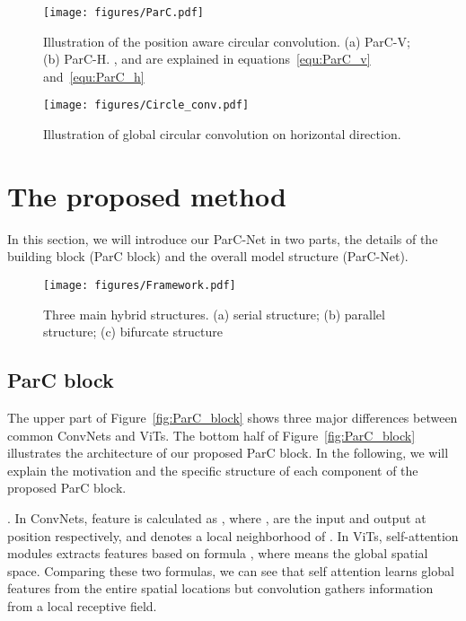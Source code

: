 \documentclass[10pt,twocolumn,letterpaper]{article}
\begin{document}
\begin{figure*}[t]
\centering
\texttt{[image: figures/ParC.pdf]}
\vspace{-0.2cm}
\caption{Illustration of the position aware circular convolution. (a) ParC-V; (b) ParC-H. ,  and  are explained in equations~\ref{equ:ParC_v} and~\ref{equ:ParC_h}}
\vspace{-0.2cm}
\label{fig:ParC}
\end{figure*}

\begin{figure*}[t]
\centering
\texttt{[image: figures/Circle\_conv.pdf]}
\vspace{-0.2cm}
\caption{Illustration of global circular convolution on horizontal direction.}
\vspace{-0.2cm}
\label{fig:circular_conv}
\end{figure*}

\section{The proposed method}


In this section, we will introduce our ParC-Net in two parts, the details of the building block (ParC block) and the overall model structure (ParC-Net). 

\begin{figure*}[t]
\centering
\texttt{[image: figures/Framework.pdf]}
\vspace{-0.3cm}
\caption{Three main hybrid structures. (a) serial structure; (b) parallel structure; (c) bifurcate structure}
\vspace{-0.3cm}
\label{fig:framework}
\end{figure*}

\subsection{ParC block}
\label{sec: ParC_block}

The upper part of Figure~\ref{fig:ParC_block} shows three major differences between common ConvNets and ViTs. The bottom half of Figure~\ref{fig:ParC_block} illustrates the architecture of our proposed ParC block. In the following, we will explain the motivation and the specific structure of each component of the proposed ParC block. 


. In ConvNets, feature is calculated as , where ,  are the input and output at position  respectively, and  denotes a local neighborhood of . In ViTs, self-attention modules extracts features based on formula , where  means the global spatial space. Comparing these two formulas, we can see that self attention learns global features from the entire spatial locations but convolution gathers information from a local receptive field.  
\end{document}
